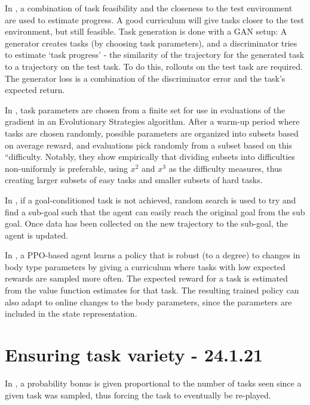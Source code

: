 \documentclass[letterpaper]{article}
\theoremstyle{definition}
\begin{document}
In \cite{Fang2020}, a combination of task feasibility and the closeness to the test environment are used to estimate progress. A good curriculum will give tasks closer to the test environment, but still feasible. Task generation is done with a GAN setup: A generator creates tasks (by choosing task parameters), and a discriminator tries to estimate `task progress' - the similarity of the trajectory for the generated task to a trajectory on the test task. To do this, rollouts on the test task are required. The generator loss is a combination of the discriminator error and the task's expected return.

In \cite{Milano2021}, task parameters are chosen from a finite set for use in evaluations of the gradient in an Evolutionary Strategies algorithm. After a warm-up period where tasks are chosen randomly, possible parameters are organized into subsets based on average reward, and evaluations pick randomly from a subset based on this ``difficulty. Notably, they show empirically that dividing subsets into difficulties non-uniformly is preferable, using $x^2$ and $x^3$ as the difficulty measures, thus creating larger subsets of easy tasks and smaller subsets of hard tasks. 

In \cite{Li}, if a goal-conditioned task is not achieved, random search is used to try and find a sub-goal such that the agent can easily reach the original goal from the sub goal. Once data has been collected on the new trajectory to the sub-goal, the agent is updated.

In \cite{Won2019}, a PPO-based agent learns a policy that is robust (to a degree) to changes in body type parameters by giving a curriculum where tasks with low expected rewards are sampled more often. 
The expected reward for a task is estimated from the value function estimates for that task. The resulting trained policy can also adapt to online changes to the body parameters, since the parameters are included in the state representation.

\section{Ensuring task variety - 24.1.21} \label{sec:variety}

In \cite{Jiang2020}, a probability bonus is given proportional to the number of tasks seen since a given task was sampled, thus forcing the task to eventually be re-played.
\end{document}
